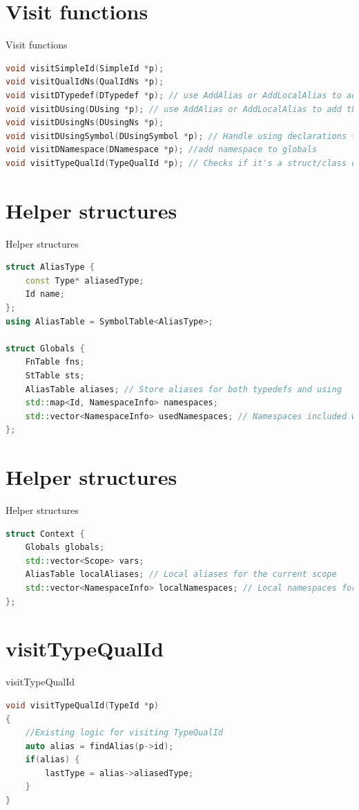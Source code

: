 \documentclass{beamer}
\begin{document}
\section{Visit functions}
\begin{frame}[fragile]{Visit functions}
\begin{lstlisting}[language=C++]
void visitSimpleId(SimpleId *p);
void visitQualIdNs(QualIdNs *p);
void visitDTypedef(DTypedef *p); // use AddAlias or AddLocalAlias to add the alias to the appropriate scope
void visitDUsing(DUsing *p); // use AddAlias or AddLocalAlias to add the alias to the appropriate scope
void visitDUsingNs(DUsingNs *p);
void visitDUsingSymbol(DUsingSymbol *p); // Handle using declarations for symbols
void visitDNamespace(DNamespace *p); //add namespace to globals
void visitTypeQualId(TypeQualId *p); // Checks if it's a struct/class or if it's in aliases
\end{lstlisting}
\end{frame}
\section{Helper structures}
\begin{frame}[fragile]{Helper structures}
\begin{lstlisting}[language=C++]
struct AliasType {
    const Type* aliasedType;
    Id name;
};
using AliasTable = SymbolTable<AliasType>;

struct Globals {
    FnTable fns;
    StTable sts;
    AliasTable aliases; // Store aliases for both typedefs and using
    std::map<Id, NamespaceInfo> namespaces;
    std::vector<NamespaceInfo> usedNamespaces; // Namespaces included with using
};
\end{lstlisting}
\end{frame}
\section{Helper structures}
\begin{frame}[fragile]{Helper structures}
\begin{lstlisting}[language=C++]
struct Context {
    Globals globals;
    std::vector<Scope> vars;
    AliasTable localAliases; // Local aliases for the current scope
    std::vector<NamespaceInfo> localNamespaces; // Local namespaces for the current scope
};
\end{lstlisting}
\end{frame}
\section{visitTypeQualId}
\begin{frame}[fragile]{visitTypeQualId}
\begin{lstlisting}[language=C++]
void visitTypeQualId(TypeId *p)
{
    //Existing logic for visiting TypeQualId
    auto alias = findAlias(p->id);
    if(alias) {
        lastType = alias->aliasedType;
    }
}
\end{lstlisting}
\end{frame}
\end{document}
